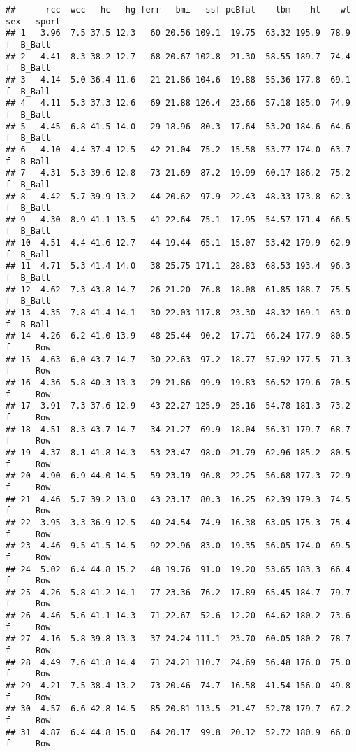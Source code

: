 \documentclass[
]{article}
\begin{document}
\begin{verbatim}
##      rcc  wcc   hc   hg ferr   bmi   ssf pcBfat    lbm    ht    wt sex   sport
## 1   3.96  7.5 37.5 12.3   60 20.56 109.1  19.75  63.32 195.9  78.9   f  B_Ball
## 2   4.41  8.3 38.2 12.7   68 20.67 102.8  21.30  58.55 189.7  74.4   f  B_Ball
## 3   4.14  5.0 36.4 11.6   21 21.86 104.6  19.88  55.36 177.8  69.1   f  B_Ball
## 4   4.11  5.3 37.3 12.6   69 21.88 126.4  23.66  57.18 185.0  74.9   f  B_Ball
## 5   4.45  6.8 41.5 14.0   29 18.96  80.3  17.64  53.20 184.6  64.6   f  B_Ball
## 6   4.10  4.4 37.4 12.5   42 21.04  75.2  15.58  53.77 174.0  63.7   f  B_Ball
## 7   4.31  5.3 39.6 12.8   73 21.69  87.2  19.99  60.17 186.2  75.2   f  B_Ball
## 8   4.42  5.7 39.9 13.2   44 20.62  97.9  22.43  48.33 173.8  62.3   f  B_Ball
## 9   4.30  8.9 41.1 13.5   41 22.64  75.1  17.95  54.57 171.4  66.5   f  B_Ball
## 10  4.51  4.4 41.6 12.7   44 19.44  65.1  15.07  53.42 179.9  62.9   f  B_Ball
## 11  4.71  5.3 41.4 14.0   38 25.75 171.1  28.83  68.53 193.4  96.3   f  B_Ball
## 12  4.62  7.3 43.8 14.7   26 21.20  76.8  18.08  61.85 188.7  75.5   f  B_Ball
## 13  4.35  7.8 41.4 14.1   30 22.03 117.8  23.30  48.32 169.1  63.0   f  B_Ball
## 14  4.26  6.2 41.0 13.9   48 25.44  90.2  17.71  66.24 177.9  80.5   f     Row
## 15  4.63  6.0 43.7 14.7   30 22.63  97.2  18.77  57.92 177.5  71.3   f     Row
## 16  4.36  5.8 40.3 13.3   29 21.86  99.9  19.83  56.52 179.6  70.5   f     Row
## 17  3.91  7.3 37.6 12.9   43 22.27 125.9  25.16  54.78 181.3  73.2   f     Row
## 18  4.51  8.3 43.7 14.7   34 21.27  69.9  18.04  56.31 179.7  68.7   f     Row
## 19  4.37  8.1 41.8 14.3   53 23.47  98.0  21.79  62.96 185.2  80.5   f     Row
## 20  4.90  6.9 44.0 14.5   59 23.19  96.8  22.25  56.68 177.3  72.9   f     Row
## 21  4.46  5.7 39.2 13.0   43 23.17  80.3  16.25  62.39 179.3  74.5   f     Row
## 22  3.95  3.3 36.9 12.5   40 24.54  74.9  16.38  63.05 175.3  75.4   f     Row
## 23  4.46  9.5 41.5 14.5   92 22.96  83.0  19.35  56.05 174.0  69.5   f     Row
## 24  5.02  6.4 44.8 15.2   48 19.76  91.0  19.20  53.65 183.3  66.4   f     Row
## 25  4.26  5.8 41.2 14.1   77 23.36  76.2  17.89  65.45 184.7  79.7   f     Row
## 26  4.46  5.6 41.1 14.3   71 22.67  52.6  12.20  64.62 180.2  73.6   f     Row
## 27  4.16  5.8 39.8 13.3   37 24.24 111.1  23.70  60.05 180.2  78.7   f     Row
## 28  4.49  7.6 41.8 14.4   71 24.21 110.7  24.69  56.48 176.0  75.0   f     Row
## 29  4.21  7.5 38.4 13.2   73 20.46  74.7  16.58  41.54 156.0  49.8   f     Row
## 30  4.57  6.6 42.8 14.5   85 20.81 113.5  21.47  52.78 179.7  67.2   f     Row
## 31  4.87  6.4 44.8 15.0   64 20.17  99.8  20.12  52.72 180.9  66.0   f     Row

\end{verbatim}
\end{document}
